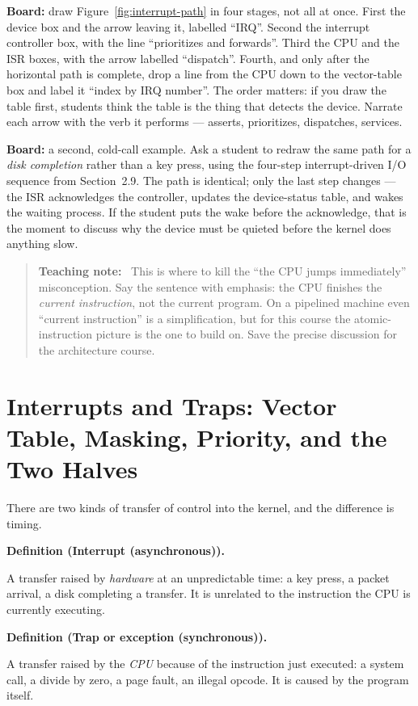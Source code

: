 \documentclass[11pt]{article}
\newenvironment{definitionbox}[1]{%
  \par\noindent\textbf{Definition (#1).}\ \itshape
}{\par\vspace{0.3em}}
\newenvironment{teachingaside}{\begin{quote}\small\color{primary-gold}\textbf{Teaching note:}\ }{\end{quote}}
\begin{document}
\textbf{Board:} draw Figure~\ref{fig:interrupt-path} in four stages, not all at
once. First the device box and the arrow leaving it, labelled ``IRQ''. Second the
interrupt controller box, with the line ``prioritizes and forwards''. Third the
CPU and the ISR boxes, with the arrow labelled ``dispatch''. Fourth, and only
after the horizontal path is complete, drop a line from the CPU down to the
vector-table box and label it ``index by IRQ number''. The order matters: if you
draw the table first, students think the table is the thing that detects the
device. Narrate each arrow with the verb it performs --- asserts, prioritizes,
dispatches, services.

\textbf{Board:} a second, cold-call example. Ask a student to redraw the same
path for a \emph{disk completion} rather than a key press, using the four-step
interrupt-driven I/O sequence from Section~2.9. The path is identical; only the
last step changes --- the ISR acknowledges the controller, updates the
device-status table, and wakes the waiting process. If the student puts the wake
before the acknowledge, that is the moment to discuss why the device must be
quieted before the kernel does anything slow.

\begin{teachingaside}
This is where to kill the ``the CPU jumps immediately'' misconception. Say the
sentence with emphasis: the CPU finishes the \emph{current instruction}, not the
current program. On a pipelined machine even ``current instruction'' is a
simplification, but for this course the atomic-instruction picture is the one to
build on. Save the precise discussion for the architecture course.
\end{teachingaside}

\section{Interrupts and Traps: Vector Table, Masking, Priority, and the Two Halves}

There are two kinds of transfer of control into the kernel, and the difference is
timing.

\begin{definitionbox}{Interrupt (asynchronous)}
A transfer raised by \emph{hardware} at an unpredictable time: a key press, a
packet arrival, a disk completing a transfer. It is unrelated to the instruction
the CPU is currently executing.
\end{definitionbox}

\begin{definitionbox}{Trap or exception (synchronous)}
A transfer raised by the \emph{CPU} because of the instruction just executed: a
system call, a divide by zero, a page fault, an illegal opcode. It is caused by
the program itself.
\end{definitionbox}
\end{document}
